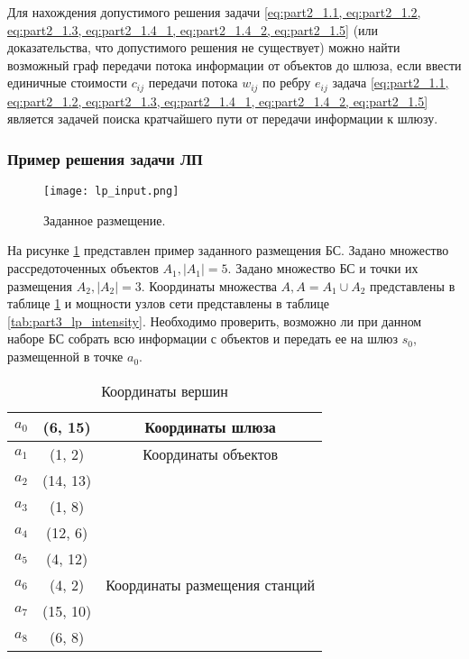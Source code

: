 Для нахождения допустимого решения задачи \cref{eq:part2_1.1, eq:part2_1.2, eq:part2_1.3, eq:part2_1.4_1, eq:part2_1.4_2,  eq:part2_1.5} (или доказательства, что допустимого решения не существует) можно найти возможный граф передачи потока информации от объектов до шлюза, если ввести единичные стоимости $c_{ij}$ передачи потока $w_{ij}$ по ребру $e_{ij}$ задача \cref{eq:part2_1.1, eq:part2_1.2, eq:part2_1.3, eq:part2_1.4_1, eq:part2_1.4_2,  eq:part2_1.5} является задачей поиска кратчайшего пути от передачи информации к шлюзу. 

\subsubsection{Пример решения задачи ЛП}


\begin{figure}[h!]
    \centering
     \texttt{[image: lp\_input.png]}
  \caption{Заданное размещение.}
  \label{fig:part3_lp_input}
  \end{figure}

На рисунке \cref{fig:part3_lp_input} представлен пример заданного размещения БС. Задано множество рассредоточенных объектов $A_1, |A_1| = 5$. Задано множество БС и точки их размещения $A_2, |A_2| = 3$. Координаты множества $A, A = A_1 \cup A_2 $ представлены в таблице \cref{tab:part3_lp_input_coordinates} и мощности узлов сети представлены в таблице \cref{tab:part3_lp_intensity}. Необходимо проверить, возможно ли при данном наборе БС собрать всю информации с объектов  и передать ее на шлюз $s_0$, размещенной в точке $a_0$. 

\begin{table}[h!]\centering
    \begin{tabular}{| c| c|c |}\hline
        $a_0$& (6, 15)& Координаты шлюза \\
        \hline
        \hline
        $a_1$&(1, 2) & Координаты объектов \\
        $a_2$&(14, 13) &  \\
        $a_3$&(1, 8) & \\
        $a_4$&(12, 6) &  \\
        $a_5$&(4, 12) &  \\
        \hline
        \hline
        $a_6$&(4, 2) & Координаты размещения станций \\
        $a_7$&(15, 10) & \\
        $a_8$&(6, 8) & \\
        \hline
    \end{tabular}\caption{Координаты вершин}\label{tab:part3_lp_input_coordinates}
\end{table}

